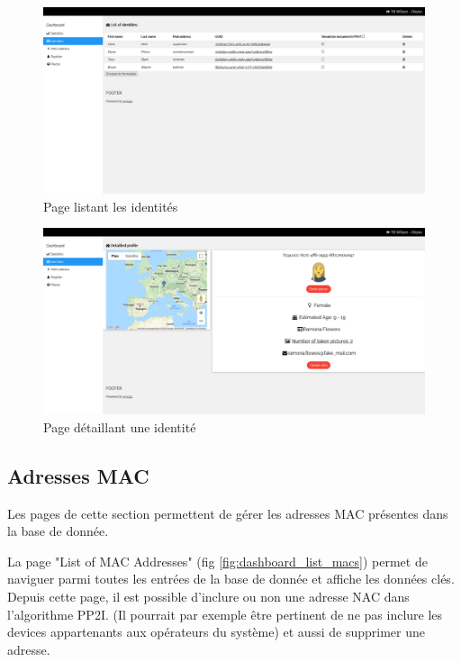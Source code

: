 \clearpage
\newpage
\thispagestyle{empty}
\begin{landscape}
    \centering
\thispagestyle{empty}
\begin{figure}[H]
	\includegraphics[width=0.95\linewidth]{images/dashboard/identities.png}
	\caption{Page listant les identités}
	\label{fig:dashboard_list_identities}
\end{figure}
\end{landscape}

\clearpage
\newpage
\thispagestyle{empty}
\begin{landscape}
    \centering
\thispagestyle{empty}
\begin{figure}[H]
	\includegraphics[width=0.95\linewidth]{images/dashboard/detailled_identities.png}
	\caption{Page détaillant une identité}
	\label{fig:dashboard_identity}
\end{figure}
\end{landscape}

\subsection{Adresses MAC}
Les pages de cette section permettent de gérer les adresses MAC présentes dans la base de donnée.

La page "List of MAC Addresses" (fig \ref{fig:dashboard_list_macs}) permet de naviguer parmi toutes les entrées de la base de donnée et affiche les données clés.
Depuis cette page, il est possible d'inclure ou non une adresse NAC dans l'algorithme PP2I. (Il pourrait par exemple être pertinent de ne pas inclure les devices appartenants aux opérateurs du système)
et aussi de supprimer une adresse.

